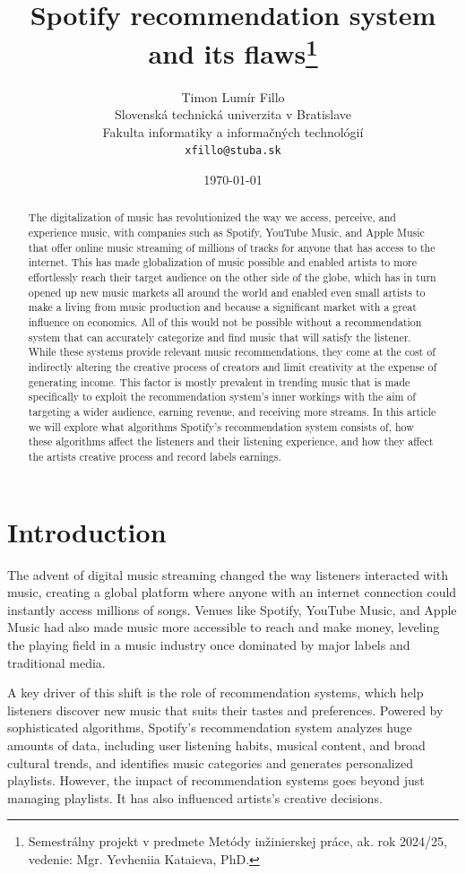 \documentclass[10pt,twoside,slovak,a4paper]{article}
\title{Spotify recommendation system and its flaws\thanks{Semestrálny projekt v predmete Metódy inžinierskej práce, ak. rok 2024/25, vedenie: Mgr. Yevheniia Kataieva, PhD.}} %
\author{Timon Lumír Fillo\\[2pt]
{\small Slovenská technická univerzita v Bratislave}\\
{\small Fakulta informatiky a informačných technológií}\\
{\small \texttt{xfillo@stuba.sk}}
}
\date{\small\today} %
\begin{document}
\maketitle

\begin{abstract}

The digitalization of music has revolutionized the way we access, perceive, and experience music, with companies such as Spotify, YouTube Music, and Apple Music that offer online music streaming of millions of tracks for anyone that has access to the internet. This has made globalization of music possible and enabled artists to more effortlessly reach their target audience on the other side of the globe, which has in turn opened up new music markets all around the world and enabled even small artists to make a living from music production and because a significant market with a great influence on economics. All of this would not be possible without a recommendation system that can accurately categorize and find music that will satisfy the listener. While these systems provide relevant music recommendations, they come at the cost of indirectly altering the creative process of creators and limit creativity at the expense of generating income. This factor is mostly prevalent in trending music that is made specifically to exploit the recommendation system's inner workings with the aim of targeting a wider audience, earning revenue, and receiving more streams. In this article we will explore what algorithms Spotify's recommendation system consists of, how these algorithms affect the listeners and their listening experience, and how they affect the artists creative process and record labels earnings.

\end{abstract}

\section{Introduction}
The advent of digital music streaming changed the way listeners interacted with music, creating a global platform where anyone with an internet connection could instantly access millions of songs. Venues like Spotify, YouTube Music, and Apple Music had also made music more accessible to reach and make money, leveling the playing field in a music industry once dominated by major labels and traditional media.

A key driver of this shift is the role of recommendation systems, which help listeners discover new music that suits their tastes and preferences. Powered by sophisticated algorithms, Spotify's recommendation system analyzes huge amounts of data, including user listening habits, musical content, and broad cultural trends, and identifies music categories and generates personalized playlists. However, the impact of recommendation systems goes beyond just managing playlists. It has also influenced artists's creative decisions.
\end{document}
